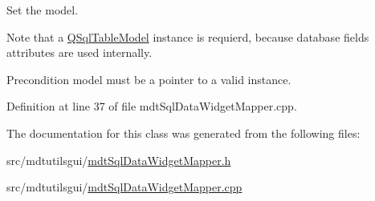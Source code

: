Set the model. 

Note that a \hyperlink{class_q_sql_table_model}{Q\-Sql\-Table\-Model} instance is requierd, because database fields attributes are used internally.

\begin{DoxyPrecond}{Precondition}
model must be a pointer to a valid instance. 
\end{DoxyPrecond}


Definition at line 37 of file mdt\-Sql\-Data\-Widget\-Mapper.\-cpp.



The documentation for this class was generated from the following files\-:\begin{DoxyCompactItemize}
\item 
src/mdtutilsgui/\hyperlink{mdt_sql_data_widget_mapper_8h}{mdt\-Sql\-Data\-Widget\-Mapper.\-h}\item 
src/mdtutilsgui/\hyperlink{mdt_sql_data_widget_mapper_8cpp}{mdt\-Sql\-Data\-Widget\-Mapper.\-cpp}\end{DoxyCompactItemize}
